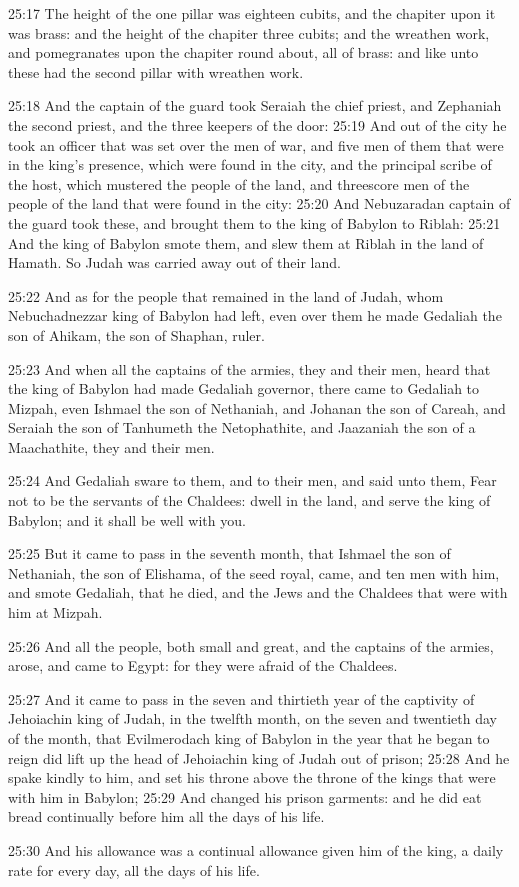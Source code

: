 25:17 The height of the one pillar was eighteen cubits, and the
chapiter upon it was brass: and the height of the chapiter three
cubits; and the wreathen work, and pomegranates upon the chapiter
round about, all of brass: and like unto these had the second pillar
with wreathen work.

25:18 And the captain of the guard took Seraiah the chief priest, and
Zephaniah the second priest, and the three keepers of the door: 25:19
And out of the city he took an officer that was set over the men of
war, and five men of them that were in the king's presence, which were
found in the city, and the principal scribe of the host, which
mustered the people of the land, and threescore men of the people of
the land that were found in the city: 25:20 And Nebuzaradan captain of
the guard took these, and brought them to the king of Babylon to
Riblah: 25:21 And the king of Babylon smote them, and slew them at
Riblah in the land of Hamath. So Judah was carried away out of their
land.

25:22 And as for the people that remained in the land of Judah, whom
Nebuchadnezzar king of Babylon had left, even over them he made
Gedaliah the son of Ahikam, the son of Shaphan, ruler.

25:23 And when all the captains of the armies, they and their men,
heard that the king of Babylon had made Gedaliah governor, there came
to Gedaliah to Mizpah, even Ishmael the son of Nethaniah, and Johanan
the son of Careah, and Seraiah the son of Tanhumeth the Netophathite,
and Jaazaniah the son of a Maachathite, they and their men.

25:24 And Gedaliah sware to them, and to their men, and said unto
them, Fear not to be the servants of the Chaldees: dwell in the land,
and serve the king of Babylon; and it shall be well with you.

25:25 But it came to pass in the seventh month, that Ishmael the son
of Nethaniah, the son of Elishama, of the seed royal, came, and ten
men with him, and smote Gedaliah, that he died, and the Jews and the
Chaldees that were with him at Mizpah.

25:26 And all the people, both small and great, and the captains of
the armies, arose, and came to Egypt: for they were afraid of the
Chaldees.

25:27 And it came to pass in the seven and thirtieth year of the
captivity of Jehoiachin king of Judah, in the twelfth month, on the
seven and twentieth day of the month, that Evilmerodach king of
Babylon in the year that he began to reign did lift up the head of
Jehoiachin king of Judah out of prison; 25:28 And he spake kindly to
him, and set his throne above the throne of the kings that were with
him in Babylon; 25:29 And changed his prison garments: and he did eat
bread continually before him all the days of his life.

25:30 And his allowance was a continual allowance given him of the
king, a daily rate for every day, all the days of his life.

